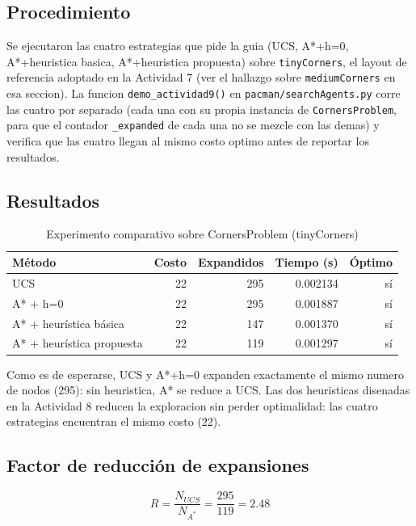 \subsection{Procedimiento}

Se ejecutaron las cuatro estrategias que pide la guia (UCS, A*+h=0, A*+heuristica basica,
A*+heuristica propuesta) sobre \texttt{tinyCorners}, el layout de referencia adoptado en la
Actividad 7 (ver el hallazgo sobre \texttt{mediumCorners} en esa seccion). La funcion
\texttt{demo\_actividad9()} en \texttt{pacman/searchAgents.py} corre las cuatro por separado (cada una
con su propia instancia de \texttt{CornersProblem}, para que el contador \texttt{\_expanded} de
cada una no se mezcle con las demas) y verifica que las cuatro llegan al mismo costo optimo antes
de reportar los resultados.

\subsection{Resultados}

\begin{table}[H]
\centering
\caption{Experimento comparativo sobre CornersProblem (tinyCorners)}
\label{tab:act9-comparativo}
\begin{tabular}{lrrrr}
\toprule
\textbf{Método} & \textbf{Costo} & \textbf{Expandidos} & \textbf{Tiempo (s)} & \textbf{Óptimo} \\
\midrule
UCS                          & 22 & 295 & 0.002134 & sí \\
A* + h=0                     & 22 & 295 & 0.001887 & sí \\
A* + heurística básica       & 22 & 147 & 0.001370 & sí \\
A* + heurística propuesta    & 22 & 119 & 0.001297 & sí \\
\bottomrule
\end{tabular}
\end{table}

Como es de esperarse, UCS y A*+h=0 expanden exactamente el mismo numero de nodos (295): sin
heuristica, A* se reduce a UCS. Las dos heuristicas disenadas en la Actividad 8 reducen la
exploracion sin perder optimalidad: las cuatro estrategias encuentran el mismo costo (22).

\subsection{Factor de reducción de expansiones}

$$R = \frac{N_{UCS}}{N_{A^*}} = \frac{295}{119} = 2.48$$

